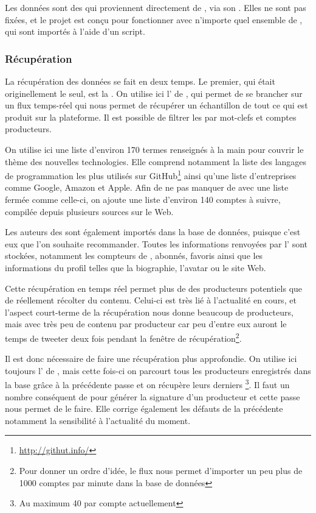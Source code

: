 Les données sont des \tweets{} qui proviennent directement de \twt{}, via son
\api{}. Elles ne sont pas fixées, et le projet est conçu pour fonctionner avec
n’importe quel ensemble de \tweets{}, qui sont importés à l’aide d’un script.

\subsubsection{Récupération}

La récupération des données se fait en deux temps. Le premier, qui était
originellement le seul, est la . On utilise ici l’\api{}
 de \twt{}, qui permet de se brancher sur un flux temps-réel qui
nous permet de récupérer un échantillon de tout ce qui est produit sur la
plateforme. Il est possible de filtrer les \tweets{} par mot-clefs et comptes
producteurs.

On utilise ici une liste d’environ 170 termes renseignés à la main pour couvrir
le thème des nouvelles technologies. Elle comprend notamment la liste des
langages de programmation les plus utilisés sur
GitHub\footnote{\url{http://githut.info/}} ainsi qu’une liste d’entreprises
comme Google, Amazon et Apple. Afin de ne pas manquer de \tweets{} avec une
liste fermée comme celle-ci, on ajoute une liste d’environ 140 comptes à
suivre, compilée depuis plusieurs sources sur le Web.

Les auteurs des \tweets{} sont également importés dans la base de données,
puisque c’est eux que l’on souhaite recommander. Toutes les informations
renvoyées par l’\api{} sont stockées, notamment les compteurs de \tweets{},
abonnés, favoris ainsi que les informations du profil telles que la biographie,
l’avatar ou le site Web.

Cette récupération en temps réel permet plus de  des producteurs
potentiels que de réellement récolter du contenu. Celui-ci est très lié à
l’actualité en cours, et l’aspect court-terme de la récupération nous donne
beaucoup de producteurs, mais avec très peu de contenu par producteur car peu
d’entre eux auront le temps de tweeter deux fois pendant la fenêtre de
récupération\footnote{Pour donner un ordre d’idée, le flux nous permet
d’importer un peu plus de 1000 comptes par minute dans la base de données}.

Il est donc nécessaire de faire une récupération plus approfondie. On utilise
ici toujours l’\api{} de \twt{}, mais cette fois-ci on parcourt tous les
producteurs enregistrés dans la base grâce à la précédente passe et on récupère
leurs derniers \tweets{}\footnote{Au maximum 40 par compte actuellement}. Il
faut un nombre conséquent de \tweets{} pour générer la signature d’un
producteur et cette passe nous permet de le faire. Elle corrige également les
défauts de la précédente notamment la sensibilité à l’actualité du moment.

